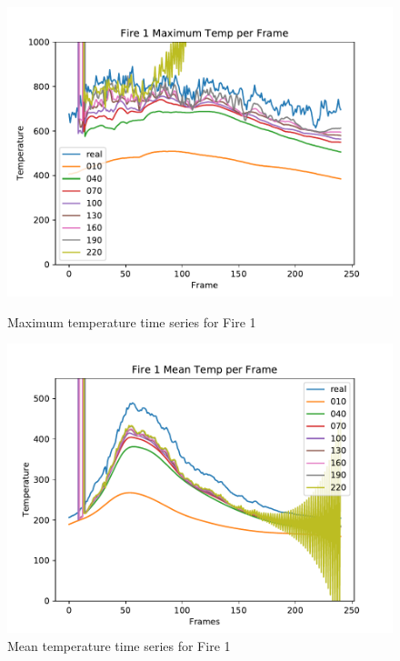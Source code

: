 \documentclass{article}
\begin{document}
\begin{figure}[ht] 
\centering
  \label{ fig7} 
  \begin{minipage}[b]{0.5\linewidth}
    \centering
    \includegraphics[width=1.1\linewidth]{../plots/f1_maxtemp.pdf} 
    \caption{Maximum temperature time series for Fire 1} 
    \vspace{4ex}
  \end{minipage}%
  \begin{minipage}[b]{0.5\linewidth}
    \centering
    \includegraphics[width=1.1\linewidth]{../plots/f1_meantemp.pdf} 
    \caption{Mean temperature time series for Fire 1} 
    \vspace{4ex}
  \end{minipage} 

\end{figure}
\end{document}
